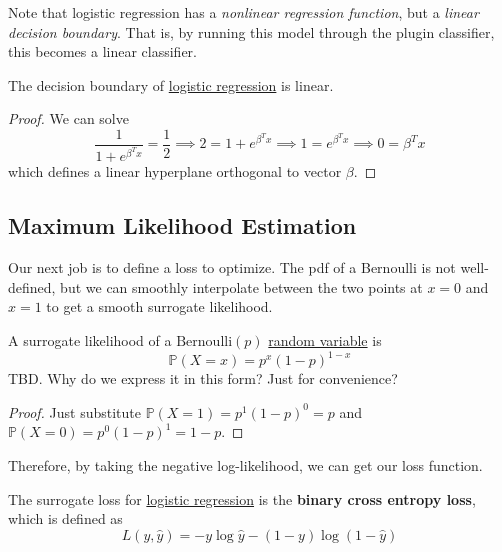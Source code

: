   Note that logistic regression has a \textit{nonlinear regression function}, but a \textit{linear decision boundary}. That is, by running this model through the plugin classifier, this becomes a linear classifier. 

  \begin{theorem}
    \label{thm:decision-boundary-is-linear}
    The decision boundary of \hyperref[def:logistic-regression]{logistic regression} is linear. 
  \end{theorem}
  \begin{proof}
    We can solve 
    \begin{equation}
      \frac{1}{1 + e^{\beta^T x}} = \frac{1}{2} \implies 2 = 1 + e^{\beta^T x} \implies 1 = e^{\beta^T x} \implies 0 = \beta^T x
    \end{equation}
    which defines a linear hyperplane orthogonal to vector $\beta$. 
  \end{proof} 

\subsection{Maximum Likelihood Estimation} 

  Our next job is to define a loss to optimize. The pdf of a Bernoulli is not well-defined, but we can smoothly interpolate between the two points at $x = 0$ and $x = 1$ to get a smooth surrogate likelihood.  

  \begin{lemma}
    \label{thm:likelihood-for-bernoulli}
    A surrogate likelihood of a $\mathrm{Bernoulli}(p)$ \hyperref[prob-def:random-variable]{random variable} is 
    \begin{equation}
      \mathbb{P}(X = x) = p^x (1 - p)^{1 - x}
    \end{equation} 
    TBD. Why do we express it in this form? Just for convenience? 
  \end{lemma} 
  \begin{proof}
    Just substitute $\mathbb{P}(X = 1) = p^1 (1 - p)^{0} = p$ and $\mathbb{P}(X = 0) = p^0 (1 - p)^1 = 1 - p$. 
  \end{proof}

  Therefore, by taking the negative log-likelihood, we can get our loss function. 

  \begin{definition}
    \label{def:binary-cross-entropy-loss-as-surrogate-loss}
    The surrogate loss for \hyperref[def:logistic-regression]{logistic regression} is the \textbf{binary cross entropy loss}, which is defined as
    \begin{equation}
      L(y, \hat{y}) = -y \log \hat{y} - (1 - y) \log (1 - \hat{y})
    \end{equation}
  \end{definition}

